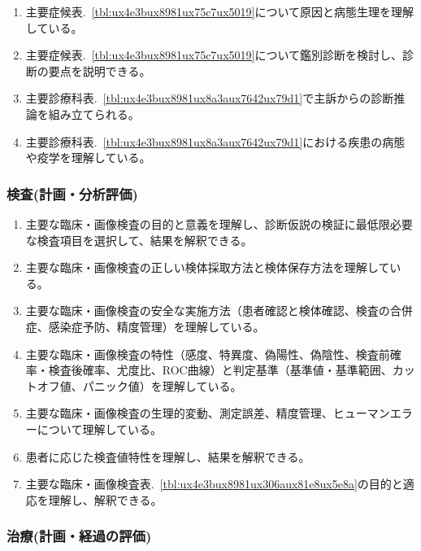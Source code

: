 \begin{enumerate}
\def\labelenumi{\arabic{enumi}.}
\tightlist
\item
  主要症候表.~\ref{tbl:ux4e3bux8981ux75c7ux5019}について原因と病態生理を理解している。
\item
  主要症候表.~\ref{tbl:ux4e3bux8981ux75c7ux5019}について鑑別診断を検討し、診断の要点を説明できる。
\item
  主要診療科表.~\ref{tbl:ux4e3bux8981ux8a3aux7642ux79d1}で主訴からの診断推論を組み立てられる。
\item
  主要診療科表.~\ref{tbl:ux4e3bux8981ux8a3aux7642ux79d1}における疾患の病態や疫学を理解している。
\end{enumerate}

\hypertarget{ux691cux67fbux8a08ux753bux5206ux6790ux8a55ux4fa1}{%
\subsubsection{検査(計画・分析評価)}\label{ux691cux67fbux8a08ux753bux5206ux6790ux8a55ux4fa1}}

\begin{enumerate}
\def\labelenumi{\arabic{enumi}.}
\tightlist
\item
  主要な臨床・画像検査の目的と意義を理解し、診断仮説の検証に最低限必要な検査項目を選択して、結果を解釈できる。
\item
  主要な臨床・画像検査の正しい検体採取方法と検体保存方法を理解している。
\item
  主要な臨床・画像検査の安全な実施方法（患者確認と検体確認、検査の合併症、感染症予防、精度管理）を理解している。
\item
  主要な臨床・画像検査の特性（感度、特異度、偽陽性、偽陰性、検査前確率・検査後確率、尤度比、ROC曲線）と判定基準（基準値・基準範囲、カットオフ値、パニック値）を理解している。
\item
  主要な臨床・画像検査の生理的変動、測定誤差、精度管理、ヒューマンエラーについて理解している。
\item
  患者に応じた検査値特性を理解し、結果を解釈できる。
\item
  主要な臨床・画像検査表.~\ref{tbl:ux4e3bux8981ux306aux81e8ux5e8a}の目的と適応を理解し、解釈できる。
\end{enumerate}

\hypertarget{ux6cbbux7642ux8a08ux753bux7d4cux904eux306eux8a55ux4fa1}{%
\subsubsection{治療(計画・経過の評価)}\label{ux6cbbux7642ux8a08ux753bux7d4cux904eux306eux8a55ux4fa1}}


